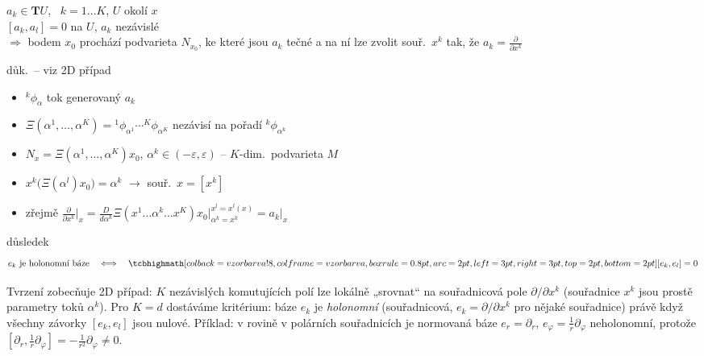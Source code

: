 \begin{veta}[Tvrzení]
$a_k\in\mathbf{T}U$, \ $k = 1\dots K$, \quad $U$ okolí $x$ \\
$[a_k,a_l] = 0$ na $U$, \quad $a_k$ nezávislé \\
$\Rightarrow$ bodem $x_0$ prochází podvarieta $N_{x_0}$, ke které jsou $a_k$ tečné
a na ní lze zvolit souř.\ $x^k$ tak, že $a_k = \frac{\partial}{\partial x^k}$
\end{veta}
důk.\ -- viz 2D případ
\begin{itemize}[nosep]
  \item[] ${}^k\phi_\alpha$ tok generovaný $a_k$
  \item[] $\Xi(\alpha^1,\dots,\alpha^K) = {}^1\phi_{\alpha^1}\cdots{}^K\phi_{\alpha^K}$ \quad nezávisí na pořadí ${}^k\phi_{\alpha^k}$
  \item[] $N_x = \Xi(\alpha^1,\dots,\alpha^K)x_0$, \quad $\alpha^k\in(-\varepsilon,\varepsilon)$ \quad -- $K$-dim.\ podvarieta $M$
  \item[] $x^k\big(\Xi(\alpha^l)x_0\big) = \alpha^k$ \quad $\to$ souř.\ $x = [x^k]$
  \item[] zřejmě \quad $\frac{\partial}{\partial x^k}\Big|_x = \frac{D}{d\alpha^k}\Xi(x^1\dots\alpha^k\dots x^K)x_0\Big|_{\alpha^k = x^k}^{x^l = x^l(x)} = a_k\big|_x$
\end{itemize}
důsledek
\[
  e_k \text{ je holonomní báze} \quad\Longleftrightarrow\quad \vzorec{[e_k,e_l] = 0}
\]

\begin{vysvetleni}
Tvrzení zobecňuje 2D případ: $K$ nezávislých komutujících polí lze lokálně „srovnat“ na souřadnicová pole $\partial/\partial x^k$ (souřadnice $x^k$ jsou prostě parametry toků $\alpha^k$). Pro $K=d$ dostáváme kritérium: báze $e_k$ je \emph{holonomní} (souřadnicová, $e_k=\partial/\partial x^k$ pro nějaké souřadnice) právě když všechny závorky $[e_k,e_l]$ jsou nulové.
Příklad: v rovině v polárních souřadnicích je normovaná báze $e_r=\partial_r$, $e_\varphi=\frac1r\partial_\varphi$ neholonomní, protože $[\partial_r,\frac1r\partial_\varphi]=-\frac1{r^2}\partial_\varphi\neq0$.
\end{vysvetleni}


